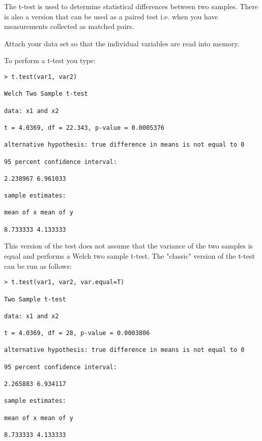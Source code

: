 The t-test is used to determine statistical differences between two samples. There is also a version that can be used as a paired test i.e. when you have measurements collected as matched pairs.


Attach your data set so that the individual variables are read into memory.

To perform a t-test you type:

\begin{framed}
\begin{verbatim}
> t.test(var1, var2)

Welch Two Sample t-test

data: x1 and x2

t = 4.0369, df = 22.343, p-value = 0.0005376

alternative hypothesis: true difference in means is not equal to 0

95 percent confidence interval:

2.238967 6.961033

sample estimates:

mean of x mean of y

8.733333 4.133333

\end{verbatim}
\end{framed}

This version of the test does not assume that the variance of the two samples is equal and performs a Welch two sample t-test. The "classic" version of the t-test can be run as follows:

\begin{framed}
\begin{verbatim}
> t.test(var1, var2, var.equal=T)

Two Sample t-test

data: x1 and x2

t = 4.0369, df = 28, p-value = 0.0003806

alternative hypothesis: true difference in means is not equal to 0

95 percent confidence interval:

2.265883 6.934117

sample estimates:

mean of x mean of y

8.733333 4.133333

\end{verbatim}
\end{framed}


